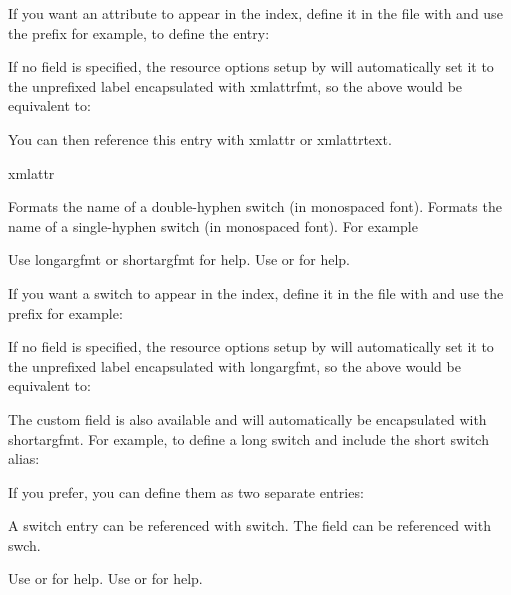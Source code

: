 \documentclass[toc=listof]{scrreport}
\begin{document}
If you want an attribute to appear in the index, define it in
the  file with  and
use the prefix  for example, to define the
 entry:
\begin{codebox}
\end{codebox}
If no  field is specified, the resource options setup by
 will automatically set it to the unprefixed label
encapsulated with \gls{xmlattrfmt}, so the above would be equivalent to:
\begin{codebox}
\end{codebox}
You can then reference this entry with \gls{xmlattr} or
\gls{xmlattrtext}.
\begin{coderesult}
\gls{xmlattr}
\tcblower
{}
\end{coderesult}

Formats the name of a double-hyphen switch (in monospaced font).
Formats the name of a single-hyphen switch (in monospaced font). For example
\begin{coderesult}
Use \gls{longargfmt} or \gls{shortargfmt}
for help.
\tcblower
Use  or 
for help.
\end{coderesult}
If you want a switch to appear in the index, define it in
the  file with  and
use the prefix  for example:
\begin{codebox}
\end{codebox}
If no  field is specified, the resource options setup by
 will automatically set it to the unprefixed label
encapsulated with \gls{longargfmt}, so the above would be equivalent to:
\begin{codebox}
\end{codebox}
The custom field  is also available and will
automatically be encapsulated with \gls{shortargfmt}. For example,
to define a long switch and include the short switch alias:
\begin{codebox}
\end{codebox}
If you prefer, you can define them as two separate entries:
\begin{codebox}
\end{codebox}
A switch entry  can be referenced with
\gls{switch}. The  field can be referenced with
\gls{swch}.
\begin{coderesult}
Use  or 
for help.
\tcblower
Use  or 
for help.
\end{coderesult}
\end{document}
